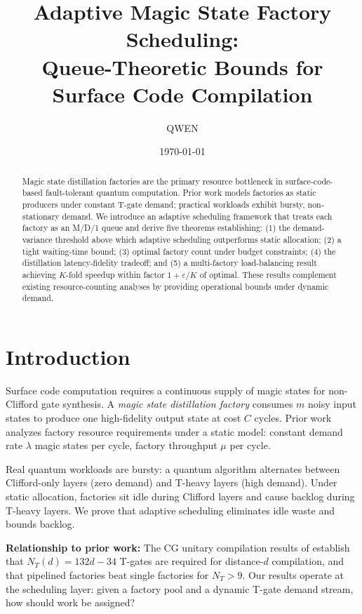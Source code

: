 \documentclass[11pt,letterpaper]{article}
\title{\textbf{Adaptive Magic State Factory Scheduling:\\
Queue-Theoretic Bounds for Surface Code Compilation}}
\author{QWEN}
\date{\today}
\begin{document}
\maketitle

\begin{abstract}
Magic state distillation factories are the primary resource bottleneck in surface-code-based
fault-tolerant quantum computation. Prior work models factories as static producers under
constant T-gate demand; practical workloads exhibit bursty, non-stationary demand. We
introduce an adaptive scheduling framework that treats each factory as an M/D/1 queue and
derive five theorems establishing: (1) the demand-variance threshold above which adaptive
scheduling outperforms static allocation; (2) a tight waiting-time bound; (3) optimal
factory count under budget constraints; (4) the distillation latency-fidelity tradeoff;
and (5) a multi-factory load-balancing result achieving $K$-fold speedup within factor
$1 + \varepsilon/K$ of optimal. These results complement existing resource-counting analyses
by providing operational bounds under dynamic demand.
\end{abstract}

\section{Introduction}
\label{sec:intro}

Surface code computation requires a continuous supply of magic states for non-Clifford
gate synthesis. A \emph{magic state distillation factory} consumes $m$ noisy input states
to produce one high-fidelity output state at cost $C$ cycles. Prior work
\cite{fowler2012,bravyi2005} analyzes factory resource requirements under a static model:
constant demand rate $\lambda$ magic states per cycle, factory throughput $\mu$ per cycle.

Real quantum workloads are bursty: a quantum algorithm alternates between Clifford-only
layers (zero demand) and T-heavy layers (high demand). Under static allocation, factories
sit idle during Clifford layers and cause backlog during T-heavy layers. We prove that
adaptive scheduling eliminates idle waste and bounds backlog.

\textbf{Relationship to prior work:} The CG unitary compilation results of
\cite{campbell2005} establish that $N_T(d) = 132d - 34$ T-gates are required for distance-$d$
compilation, and that pipelined factories beat single factories for $N_T > 9$. Our results
operate at the scheduling layer: given a factory pool and a dynamic T-gate demand stream,
how should work be assigned?
\end{document}
